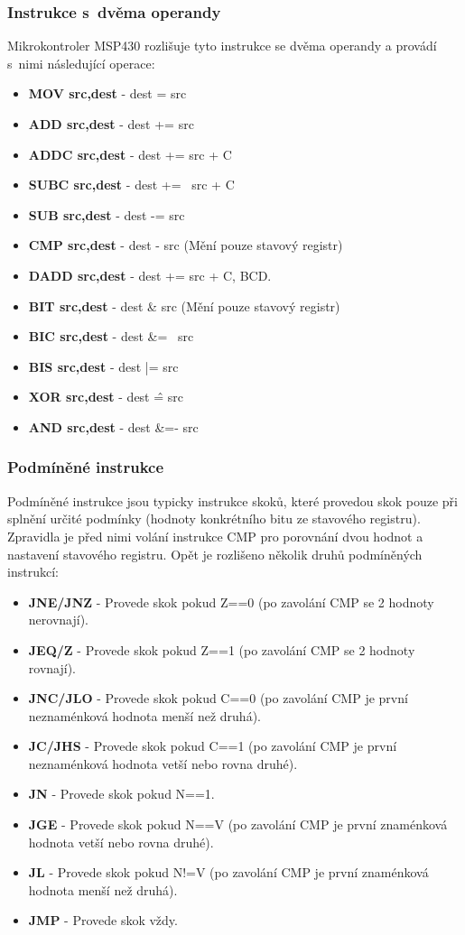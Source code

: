\subsubsection{Instrukce s~dvěma operandy}

Mikrokontroler MSP430 rozlišuje tyto instrukce se dvěma operandy a provádí s~nimi následující operace:

\begin{itemize}
\item \textbf{MOV src,dest} - dest = src
\item \textbf{ADD src,dest} - dest += src
\item \textbf{ADDC src,dest} - dest += src + C
\item \textbf{SUBC src,dest} - dest += ~src + C
\item \textbf{SUB src,dest} - dest -= src
\item \textbf{CMP src,dest} - dest - src (Mění pouze stavový registr)
\item \textbf{DADD src,dest} - dest += src + C, BCD.
\item \textbf{BIT src,dest} - dest \& src (Mění pouze stavový registr)
\item \textbf{BIC src,dest} - dest \&= ~src
\item \textbf{BIS src,dest} - dest |= src
\item \textbf{XOR src,dest} - dest \^ = src
\item \textbf{AND src,dest} - dest \&=- src
\end{itemize}

\subsubsection{Podmíněné instrukce}

Podmíněné instrukce jsou typicky instrukce skoků, které provedou skok pouze při splnění určité podmínky (hodnoty konkrétního bitu ze stavového registru). Zpravidla je před nimi volání instrukce CMP pro porovnání dvou hodnot a nastavení stavového registru. Opět je rozlišeno několik druhů podmíněných instrukcí:

\begin{itemize}
\item \textbf{JNE/JNZ} - Provede skok pokud Z==0 (po zavolání CMP se 2 hodnoty nerovnají).
\item \textbf{JEQ/Z} - Provede skok pokud Z==1 (po zavolání CMP se 2 hodnoty rovnají).
\item \textbf{JNC/JLO} - Provede skok pokud C==0 (po zavolání CMP je první neznaménková hodnota menší než druhá).
\item \textbf{JC/JHS} - Provede skok pokud C==1 (po zavolání CMP je první neznaménková hodnota vetší nebo rovna druhé).
\item \textbf{JN} - Provede skok pokud N==1.
\item \textbf{JGE} - Provede skok pokud N==V (po zavolání CMP je první znaménková hodnota vetší nebo rovna druhé).
\item \textbf{JL} - Provede skok pokud N!=V (po zavolání CMP je první znaménková hodnota menší než druhá).
\item \textbf{JMP} - Provede skok vždy.
\end{itemize}

